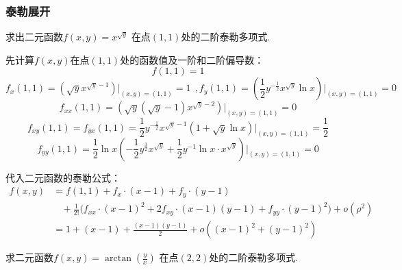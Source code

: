 \subsubsection{泰勒展开}

\begin{example}[2022 B卷]
\label{ex:ch06-20}
求出二元函数$f(x,y) = x^{\sqrt{y}}$
在点$(1,1)$处的二阶泰勒多项式.
\end{example}

\begin{solution}
先计算$f(x,y)$在点$(1,1)$处的函数值及一阶和二阶偏导数：
$$
f(1,1) = 1
$$
$$
f_x(1,1) = \left(\sqrt{y} x^{\sqrt{y} - 1}\right) \bigg|_{(x,y) = (1,1)} = 1 ~~,
f_y(1,1) = \left(\frac{1}{2}  y^{-\frac{1}{2}} x^{\sqrt{y} }\ln x \right) \bigg|_{(x,y) = (1,1)} = 0
$$
$$
f_{xx}(1,1) = \left(\sqrt{y}(\sqrt{y} - 1) x^{\sqrt{y} - 2} \right)\bigg|_{(x,y)=(1,1)} = 0
$$
$$
f_{xy}(1,1) = f_{yx}(1,1) = \frac{1}{2} y^{-\frac{1}{2}} x^{\sqrt{y} - 1} \left( 1 + \sqrt{y} \ln x\right) \bigg|_{(x,y) = (1,1)} = \frac{1}{2}
$$
$$
f_{yy}(1,1) = \frac{1}{2} \ln x \left( -\frac{1}{2} y^{\frac{3}{2} }x^{\sqrt{y}} + \frac{1}{2} y^{-1} \ln x \cdot x^{\sqrt{y}} \right) \bigg|_{(x,y)=(1,1)} = 0
$$

代入二元函数的泰勒公式：
\begin{equation}
    \begin{aligned}
        f(x,y) &= f(1,1) + f_x \cdot (x-1) + f_y\cdot (y-1) \\
        &~~~~+ \frac{1}{2!} \bigg(f_{xx} \cdot(x-1)^2 + 2f_{xy}\cdot (x-1)(y-1) + f_{yy}\cdot (y-1)^2 \bigg) + o(\rho^2) \\
        &= 1 + (x-1) + \frac{(x-1)(y-1)}{2} + o\left((x-1)^2 + (y-1)^2 \right)
        \nonumber
    \end{aligned}
\end{equation}
\end{solution}

\begin{example}[2022 A卷]
\label{ex:ch06-21}
求二元函数$f(x,y) = \arctan\left( \frac{y}{x}\right)$
在点$(2,2)$处的二阶泰勒多项式.
\end{example}

